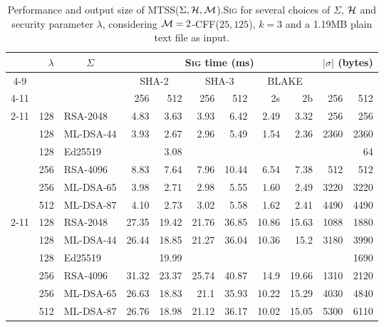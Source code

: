 \begin{table}[ht]
  \setlength{\tabcolsep}{5.75pt}
  \centering
  \caption{Performance and output size of \textsc{MTSS}($\Sigma, \mathcal{H}, \mathcal{M}$).\textsc{Sig} for several choices of $\Sigma$, $\mathcal{H}$ and security parameter $\lambda$, considering $\mathcal{M} = 2$-CFF($25, 125$), $k = 3$ and a 1.19MB plain text file as input.}
  \begin{tabular}{crlrrrrrrrr}
    \toprule
    &
    \multicolumn{1}{r}{\multirow{5}{*}{$\lambda$}}
        & \multicolumn{1}{c}{\multirow{5}{*}{$\Sigma$}}
        & \multicolumn{6}{c}{\textsc{Sig} time (ms)}
        & \multicolumn{2}{c}{\multirow{3}{*}{$|\sigma|$ (bytes)}} \\
    \cmidrule{4-9}
    & &
        & \multicolumn{2}{c}{SHA-2}
        & \multicolumn{2}{c}{SHA-3}
        & \multicolumn{2}{c}{BLAKE}
        & \\
    \cmidrule{4-11}
    & & & 256 & 512 & 256 & 512 & 2s & 2b & 256 & 512 \\
    \cmidrule{2-11}
    \multirow{6}{*}{\rotatebox[origin=c]{90}{Raw $\Sigma$}}
    & 128 & RSA-2048         & 4.83 & 3.63 & 3.93 & 6.42 & 2.49 & 3.32 & 256  & 256  \\
    & 128 & ML-DSA-44        & 3.93 & 2.67 & 2.96 & 5.49 & 1.54 & 2.36 & 2360 & 2360 \\
    & 128 & Ed25519          &      & 3.08 &      &       &      &      &      & 64   \\
    & 256 & RSA-4096         & 8.83 & 7.64 & 7.96 & 10.44 & 6.54 & 7.38 & 512  & 512  \\
    & 256 & ML-DSA-65        & 3.98 & 2.71 & 2.98 & 5.55 & 1.60 & 2.49 & 3220 & 3220 \\
    & 512 & ML-DSA-87        & 4.10 & 2.73 & 3.02 & 5.58 & 1.62 & 2.41 & 4490 & 4490 \\
    \cmidrule{2-11}
    \multirow{6}{*}{\rotatebox[origin=c]{90}{\textsc{MTSS}}} 
    & 128 & RSA-2048         & 27.35 & 19.42 & 21.76 & 36.85 & 10.86 & 15.63 & 1088 & 1880  \\
    & 128 & ML-DSA-44        & 26.44 & 18.85 & 21.27 & 36.04 & 10.36 & 15.2 & 3180 & 3990  \\
    & 128 & Ed25519          &       & 19.99 &       &       &       &       &      & 1690  \\
    & 256 & RSA-4096         & 31.32 & 23.37 & 25.74 & 40.87 & 14.9 & 19.66 & 1310 & 2120  \\
    & 256 & ML-DSA-65        & 26.63 & 18.83 & 21.1 & 35.93 & 10.22 & 15.29 & 4030 & 4840  \\
    & 512 & ML-DSA-87        & 26.76 & 18.98 & 21.12 & 36.17 & 10.02 & 15.05 & 5300 & 6110  \\
    \bottomrule
  \end{tabular}
  \label{table:performance-signature-traditional-mtss}
\end{table}